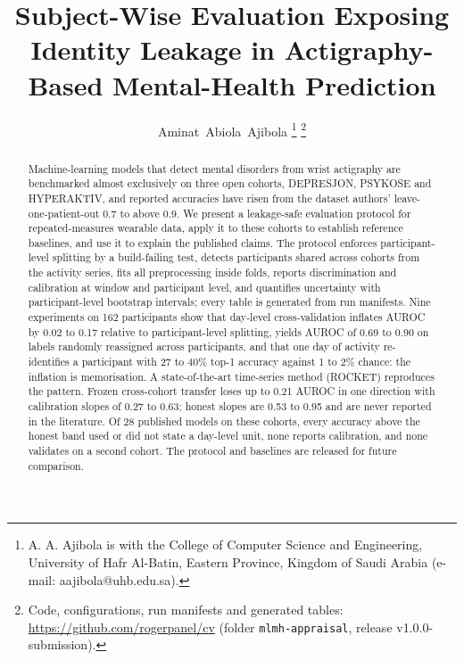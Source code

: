 \documentclass[journal]{IEEEtran}
\begin{document}
\title{Subject-Wise Evaluation Exposing Identity Leakage in Actigraphy-Based Mental-Health Prediction}
\author{Aminat~Abiola~Ajibola%
\thanks{A. A. Ajibola is with the College of Computer Science and Engineering, University of Hafr Al-Batin, Eastern Province, Kingdom of Saudi Arabia (e-mail: aajibola@uhb.edu.sa).}%
\thanks{Code, configurations, run manifests and generated tables: \url{https://github.com/rogerpanel/cv} (folder \texttt{mlmh-appraisal}, release v1.0.0-submission).}}
\maketitle

\begin{abstract}
Machine-learning models that detect mental disorders from wrist actigraphy are benchmarked almost exclusively on three open cohorts, DEPRESJON, PSYKOSE and HYPERAKTIV, and reported accuracies have risen from the dataset authors' leave-one-patient-out 0.7 to above 0.9. We present a leakage-safe evaluation protocol for repeated-measures wearable data, apply it to these cohorts to establish reference baselines, and use it to explain the published claims. The protocol enforces participant-level splitting by a build-failing test, detects participants shared across cohorts from the activity series, fits all preprocessing inside folds, reports discrimination and calibration at window and participant level, and quantifies uncertainty with participant-level bootstrap intervals; every table is generated from run manifests. Nine experiments on 162 participants show that day-level cross-validation inflates AUROC by 0.02 to 0.17 relative to participant-level splitting, yields AUROC of 0.69 to 0.90 on labels randomly reassigned across participants, and that one day of activity re-identifies a participant with 27 to 40\% top-1 accuracy against 1 to 2\% chance: the inflation is memorisation. A state-of-the-art time-series method (ROCKET) reproduces the pattern. Frozen cross-cohort transfer loses up to 0.21 AUROC in one direction with calibration slopes of 0.27 to 0.63; honest slopes are 0.53 to 0.95 and are never reported in the literature. Of 28 published models on these cohorts, every accuracy above the honest band used or did not state a day-level unit, none reports calibration, and none validates on a second cohort. The protocol and baselines are released for future comparison.
\end{abstract}
\end{document}
